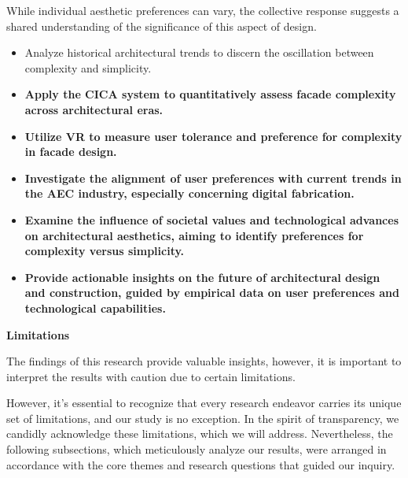 
While individual aesthetic preferences can vary, the collective response suggests a shared understanding of the significance of this aspect of design.




\begin{itemize}
    \item Analyze historical architectural trends to discern the oscillation between complexity and simplicity.
    \item \textbf{Apply the CICA system to quantitatively assess facade complexity across architectural eras.}
    \item \textbf{Utilize VR to measure user tolerance and preference for complexity in facade design.}
    \item \textbf{Investigate the alignment of user preferences with current trends in the AEC industry, especially concerning digital fabrication.}
    \item \textbf{Examine the influence of societal values and technological advances on architectural aesthetics, aiming to identify preferences for complexity versus simplicity.}
    \item \textbf{Provide actionable insights on the future of architectural design and construction, guided by empirical data on user preferences and technological capabilities.}
\end{itemize}



\textbf{Limitations}

The findings of this research provide valuable insights, however, it is important to interpret the results with caution due to certain limitations.

However, it's essential to recognize that every research endeavor carries its unique set of limitations, and our study is no exception.
In the spirit of transparency, we candidly acknowledge these limitations, which we will address.
Nevertheless, the following subsections, which meticulously analyze our results, were arranged in accordance with the core themes and research questions that guided our inquiry.

